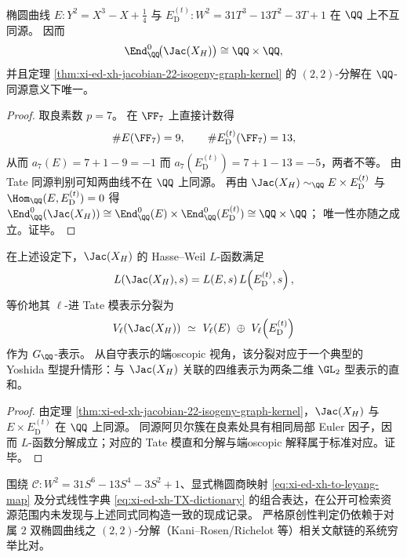 \begin{proposition}\label{prop:xi-ed-xh-nonisogenous-and-endomorphism-rigidity}
椭圆曲线 \(E: Y^2=X^3-X+\tfrac14\) 与 \(E_{\mathrm D}^{(t)}:W^2=31T^3-13T^2-3T+1\) 在 \(\QQ\) 上不互同源。
因而
\[
\End^0_{\QQ}\!\bigl(\Jac(X_H)\bigr)\cong \QQ\times\QQ,
\]
并且定理 \ref{thm:xi-ed-xh-jacobian-22-isogeny-graph-kernel} 的 \((2,2)\)-分解在 \(\QQ\)-同源意义下唯一。
\end{proposition}
\begin{proof}
取良素数 \(p=7\)。
在 \(\FF_7\) 上直接计数得
\[
\#E(\FF_7)=9,\qquad \#E_{\mathrm D}^{(t)}(\FF_7)=13,
\]
从而
\(
a_7(E)=7+1-9=-1
\)
而
\(
a_7(E_{\mathrm D}^{(t)})=7+1-13=-5
\)，两者不等。
由 Tate 同源判别可知两曲线不在 \(\QQ\) 上同源。
再由 \(\Jac(X_H)\sim_{\QQ}E\times E_{\mathrm D}^{(t)}\) 与 \(\Hom_{\QQ}(E,E_{\mathrm D}^{(t)})=0\) 得
\(
\End^0_{\QQ}(\Jac(X_H))\cong \End^0_{\QQ}(E)\times \End^0_{\QQ}(E_{\mathrm D}^{(t)})\cong \QQ\times\QQ
\)；
唯一性亦随之成立。证毕。
\end{proof}

\begin{corollary}\label{cor:xi-ed-xh-lfunction-tatemodule-endoscopic-splitting}
在上述设定下，\(\Jac(X_H)\) 的 Hasse--Weil \(L\)-函数满足
\[
L\!\left(\Jac(X_H),s\right)=L(E,s)\,L\!\left(E_{\mathrm D}^{(t)},s\right),
\]
等价地其 \(\ell\)-进 Tate 模表示分裂为
\[
V_\ell\!\left(\Jac(X_H)\right)\ \simeq\ V_\ell(E)\ \oplus\ V_\ell\!\left(E_{\mathrm D}^{(t)}\right)
\]
作为 \(G_{\QQ}\)-表示。
从自守表示的端oscopic 视角，该分裂对应于一个典型的 Yoshida 型提升情形：与 \(\Jac(X_H)\) 关联的四维表示为两条二维 \(\GL_2\) 型表示的直和。
\end{corollary}
\begin{proof}
由定理 \ref{thm:xi-ed-xh-jacobian-22-isogeny-graph-kernel}，\(\Jac(X_H)\) 与 \(E\times E_{\mathrm D}^{(t)}\) 在 \(\QQ\) 上同源。
同源阿贝尔簇在良素处具有相同局部 Euler 因子，因而 \(L\)-函数分解成立；对应的 Tate 模直和分解与端oscopic 解释属于标准对应。证毕。
\end{proof}

\begin{remark}[公开索引层面的否证性核验说明]\label{rem:xi-ed-xh-hyperelliptic-leyang-novelty-note}
围绕 \(\mathcal C:W^2=31S^6-13S^4-3S^2+1\)、显式椭圆商映射 \eqref{eq:xi-ed-xh-to-leyang-map} 及分式线性字典 \eqref{eq:xi-ed-xh-TX-dictionary} 的组合表达，在公开可检索资源范围内未发现与上述同式同构造一致的现成记录。
严格原创性判定仍依赖于对属 \(2\) 双椭圆曲线之 \((2,2)\)-分解（Kani--Rosen/Richelot 等）相关文献链的系统穷举比对。
\end{remark}

